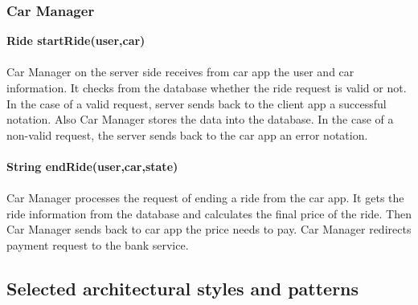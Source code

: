 \documentclass{article}
\begin{document}
	\subsubsection{Car Manager}
	\textbf{Ride startRide(user,car)}
	\\
	\\Car Manager on the server side receives from car app the user and car information. It checks from the database whether the ride request is valid or not. In the case of a valid request, server sends back to the client app a successful notation. Also Car Manager stores the data into the database. In the case of a non-valid request, the server sends back to the car app an error notation.
	\\
	\\\textbf{String endRide(user,car,state)}
	\\
	\\Car Manager processes the request of ending a ride from the car app. It gets the ride information from the database and calculates the final price of the ride. Then Car Manager sends back to car app the price  needs to pay. Car Manager redirects payment request to the bank service. 
	\subsection{Selected architectural styles and patterns}
\end{document}
